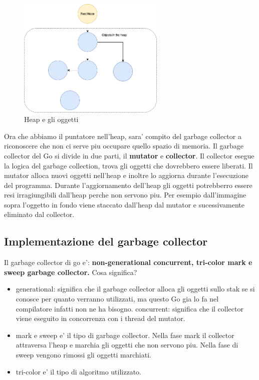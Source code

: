 \begin{figure}[h!]
    \centering
    \includegraphics[width=7cm]{sections/go-garbage-heap.png}
    \caption{Heap e gli oggetti}
    \label{fig:my_label}
\end{figure}

Ora che abbiamo il puntatore nell'heap, sara' compito del garbage collector a riconoscere che non ci serve piu occupare quello spazio di memoria. \newline
Il garbage collector del Go si divide in due parti, il \textbf{mutator} e \textbf{collector}. \newline
Il collector esegue la logica del garbage collection, trova gli oggetti che dovrebbero essere liberati. \newline
Il mutator alloca nuovi oggetti nell'heap e inoltre lo aggiorna durante l'esecuzione del programma. Durante l'aggiornamento dell'heap gli oggetti potrebberro essere resi irragiungibili dall'heap perche non servono piu. Per esempio dall'immagine sopra l'oggetto in fondo viene staccato dall'heap dal mutator e sucessivamente eliminato dal collector.

\subsection{Implementazione del garbage collector}

Il garbage collector di go e': \textbf{non-generational concurrent, tri-color mark e sweep garbage collector.} \newline Cosa significa?
\begin{itemize}
    \item generational: significa che il garbage collector alloca gli oggetti sullo stak se si conosce per quanto verranno utilizzati, ma questo Go gia lo fa nel compilatore infatti non ne ha bisogno. \newline
    concurrent: significa che il collector viene eseguito in concorrenza con i thread del mutator.
    \item mark e sweep e' il tipo di garbage collector. \newline
    Nella fase mark il collector attraversa l'heap e marchia gli oggetti che non servono piu. \newline
    Nella fase di sweep vengono rimossi gli oggetti marchiati.
    \item tri-color e' il tipo di algoritmo utilizzato.
\end{itemize}

